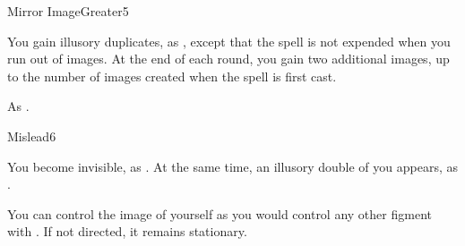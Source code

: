 \begin{spellsection}{Mirror Image}{Greater}{5}
\begin{spellheader}
\end{spellheader}
\begin{spellcontent}
    \begin{spelltargetinginfo}
    \end{spelltargetinginfo}
    \begin{spelleffects}
        \spelleffect You gain illusory duplicates, as , except that the spell is not expended when you run out of images. At the end of each round, you gain two additional images, up to the number of images created when the spell is first cast.
        \spelldur \durshort \dismissable
    \end{spelleffects}
\end{spellcontent}
\begin{spellfooter}
    \spellnotes As .
\end{spellfooter}
\end{spellsection}

\begin{spellsection}{Mislead}{6}
\begin{spellheader}
\end{spellheader}
\begin{spellcontent}
    \begin{spelltargetinginfo}
    \end{spelltargetinginfo}
    \begin{spelleffects}
        \spelleffect You become invisible, as . At the same time, an illusory double of you appears, as .

        You can control the image of yourself as you would control any other figment with . If not directed, it remains stationary.
        \spelldur \durshort \dismissable
    \end{spelleffects}
\end{spellcontent}
\begin{spellfooter}
\end{spellfooter}
\end{spellsection}

